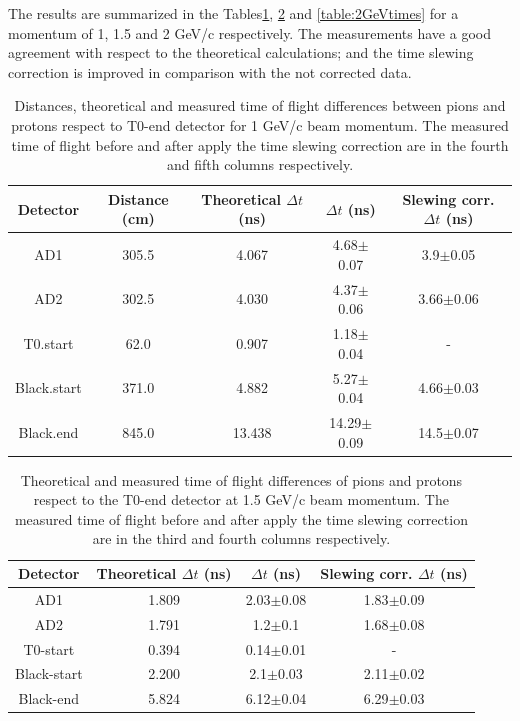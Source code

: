 	The results are summarized in the Tables\ref{table:1GeVtimes}, \ref{table:1p5GeVtimes}
	and \ref{table:2GeVtimes} for a momentum of 1, 1.5 and 2 GeV/c respectively. The measurements have a good
	agreement with respect to the theoretical calculations; and the time slewing correction is improved in
	comparison with the not corrected data.
	
	\begin{table}[h!]
		\centering
		\begin{tabular}{ | c|| c || c c c| } \hline
			\textbf{Detector} & Distance (cm) &Theoretical $\Delta t$ (ns) &$\Delta t$ (ns) &Slewing corr. $\Delta t$ (ns) \\ \hline\hline
			
			AD1	    &305.5	&4.067	&4.68$\pm$0.07	&3.9$\pm$0.05	\\
			AD2	    &302.5	&4.030	&4.37$\pm$0.06	&3.66$\pm$0.06	\\
			T0.start      &62.0	&0.907	&1.18$\pm$0.04	&-		\\
			Black.start   &371.0	&4.882	&5.27$\pm$0.04	&4.66$\pm$0.03	\\
			Black.end     &845.0	&13.438	&14.29$\pm$0.09	&14.5$\pm$0.07\\ \hline
			\hline
		\end{tabular}
		\caption{Distances, theoretical and measured time of flight differences between pions and protons respect
			to T0-end detector for 1 GeV/c beam momentum. The measured time of flight before and
			after apply the time slewing correction are in the fourth and fifth columns respectively.
			}
		\label{table:1GeVtimes}
	\end{table}

	\begin{table}[h!]
	\centering
	\begin{tabular}{ | c||c c c| } \hline
		\textbf{Detector} &Theoretical $\Delta t$ (ns) &$\Delta t$ (ns) &Slewing corr. $\Delta t$ (ns) \\ \hline\hline
		
		AD1	    &1.809	&2.03$\pm$0.08	&1.83$\pm$0.09	\\
		AD2	    &1.791	&1.2$\pm$0.1	&1.68$\pm$0.08	\\
		T0-start      &0.394	&0.14$\pm$0.01	&-		\\
		Black-start   &2.200	&2.1$\pm$0.03	&2.11$\pm$0.02	\\
		Black-end     &5.824	&6.12$\pm$0.04	&6.29$\pm$0.03 	\\ \hline
		\hline
	\end{tabular}
	\caption{Theoretical and measured time of flight differences of pions and protons respect
		to the T0-end detector at 1.5 GeV/c beam momentum. %
		The measured time of flight before and
		after apply the time slewing correction are in the third and fourth columns respectively.}
	\label{table:1p5GeVtimes}
	\end{table}

